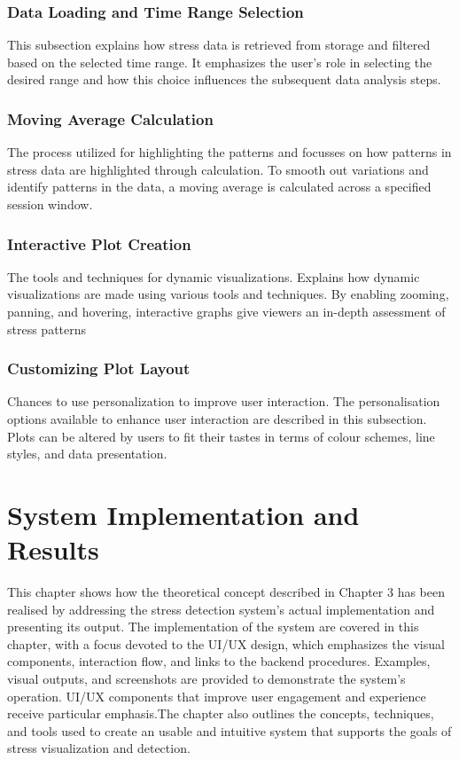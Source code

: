 \documentclass[Arial,12pt,openright,twoside]{book}
\begin{document}
\subsection{Data Loading and Time Range Selection}
This subsection explains how stress data is retrieved from storage and filtered based on the selected time range. It emphasizes the user’s role in selecting the desired range and how this choice influences the subsequent data analysis steps. %
\subsection{Moving Average Calculation}
The process utilized for highlighting the patterns and focusses on how patterns in stress data are highlighted through calculation. To smooth out variations and identify patterns in the data, a moving average is calculated across a specified session window.
\subsection{Interactive Plot Creation}
The tools and techniques for dynamic visualizations. Explains how dynamic visualizations are made using various tools and techniques. By enabling zooming, panning, and hovering, interactive graphs give viewers an in-depth assessment of stress patterns
\subsection{Customizing Plot Layout}
 Chances to use personalization to improve user interaction. The personalisation options available to enhance user interaction are described in this subsection. Plots can be altered by users to fit their tastes in terms of colour schemes, line styles, and data presentation.
\chapter{System Implementation and Results}
\clearpage 
 This chapter shows how the theoretical concept described in Chapter 3 has been realised by addressing the stress detection system's actual implementation and presenting its output. The implementation of the system are covered in this chapter, with a focus devoted to the UI/UX design, which emphasizes the visual components, interaction flow, and links to the backend procedures.  Examples, visual outputs, and screenshots are provided to demonstrate the system's operation. UI/UX components that improve user engagement and experience receive particular emphasis.The chapter also outlines the concepts, techniques, and tools used to create an usable and intuitive system that supports the goals of stress visualization and detection.
\end{document}
